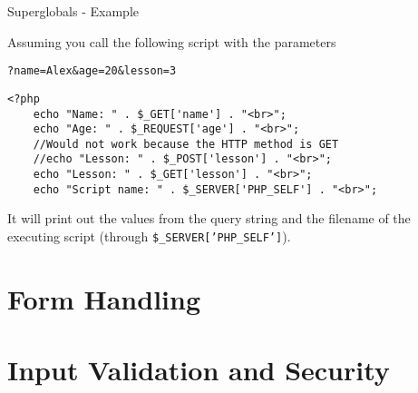 \begin{frame}[fragile]{Superglobals - Example}

	Assuming you call the following script with the parameters 
	
	\texttt{?name=Alex\&{}age=20\&{}lesson=3}
	
	\begin{lstlisting}
<?php
	echo "Name: " . $_GET['name'] . "<br>";
	echo "Age: " . $_REQUEST['age'] . "<br>";
	//Would not work because the HTTP method is GET
	//echo "Lesson: " . $_POST['lesson'] . "<br>";
	echo "Lesson: " . $_GET['lesson'] . "<br>";
	echo "Script name: " . $_SERVER['PHP_SELF'] . "<br>";
	\end{lstlisting}
	
	It will print out the values from the query string and the filename of the executing script (through \texttt{\$\_{}SERVER['PHP\_{}SELF']}). 
\end{frame}

\section{Form Handling}

\section{Input Validation and Security}



